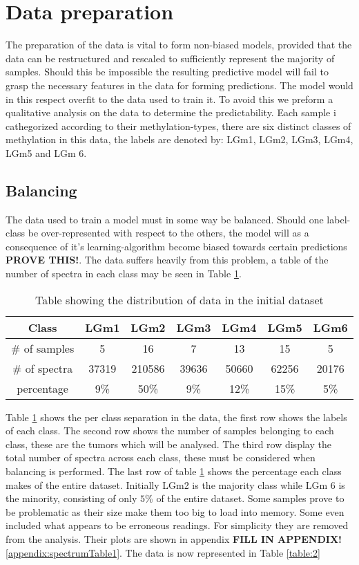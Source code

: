 \section{Data preparation}
The preparation of the data is vital to form non-biased models, provided that the data can be restructured and rescaled to sufficiently represent the majority of samples. Should this be impossible the resulting predictive model will fail to grasp the necessary features in the data for forming predictions. The model would in this respect overfit to the data used to train it. To avoid this we preform a qualitative analysis on the data to determine the predictability. Each sample i cathegorized according to their methylation-types, there are six distinct classes of methylation in this data, the labels are denoted by: LGm1, LGm2, LGm3, LGm4, LGm5 and LGm 6.

\subsection{Balancing}
The data used to train a model must in some way be balanced. Should one label-class be over-represented with respect to the others, the model will as a consequence of it's learning-algorithm become biased towards certain predictions \textbf{PROVE THIS!}. The data suffers heavily from this problem, a table of the number of spectra in each class may be seen in Table \ref{table:1}.
\\

\begin{table}[h!]
\centering
 \begin{tabular}{||c c c c c c c||} 
 \hline
 Class & LGm1 & LGm2 & LGm3 & LGm4 & LGm5 & LGm6 \\ [0.5ex] 
 \hline\hline
 \# of samples & 5& 16 & 7 & 13 & 15 & 5 \\ 
 \hline
 \# of spectra & 37319 & 210586 & 39636 & 50660 & 62256 & 20176 \\
 \hline
 percentage & 9\%& 50\% & 9\% & 12\% & 15\% & 5\% \\
 \hline

\end{tabular}
\caption{Table showing the distribution of data in the initial dataset}
\label{table:1}
\end{table}

\newpage
Table \ref{table:1} shows the per class separation in the data, the first row shows the labels of each class. The second row shows the number of samples belonging to each class, these are the tumors which will be analysed. The third row display the total number of spectra across each class, these must be considered when balancing is performed. The last row of table \ref{table:1} shows the percentage each class makes of the entire dataset. Initially LGm2 is the majority class while LGm 6 is the minority, consisting of only $5$\% of the entire dataset. Some samples prove to be problematic as their size make them too big to load into memory. Some even included what appears to be erroneous readings. For simplicity they are removed from the analysis. Their plots are shown in appendix \textbf{FILL IN APPENDIX!}\ref{appendix:spectrumTable1}. The data is now represented in Table \ref{table:2}
\\

